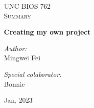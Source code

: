 \begin{titlepage}
\vbox{ }

\vbox{ }

\begin{center}
\textsc{\LARGE UNC BIOS 762}\\[1.5cm]
\textsc{\Large Summary}\\[0.5cm]

\vbox{ }

{ \huge \bfseries Creating my own project}\\[0.4cm]

\begin{minipage}{0.4\textwidth}
\begin{flushleft} \large
\emph{Author:}\\
Mingwei Fei
\end{flushleft}
\end{minipage}
\begin{minipage}{0.4\textwidth}
\begin{flushright} \large
\emph{Special colaborator:} \\
Bonnie
\end{flushright}
\end{minipage}
\vfill
{\large Jan, 2023}
\end{center}
\end{titlepage}